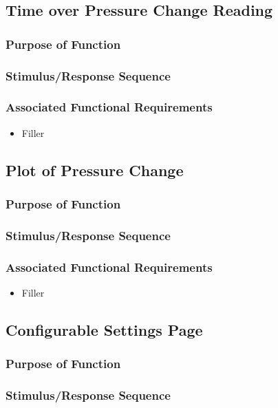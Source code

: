 \documentclass[onecolumn, draftclsnofoot,10pt, compsoc]{IEEEtran}
\begin{document}
\subsection{Time over Pressure Change Reading}
\subsubsection{Purpose of Function}
\subsubsection{Stimulus/Response Sequence}
\subsubsection{Associated Functional Requirements}
\begin{itemize}
\item Filler
\end{itemize}

\subsection{Plot of Pressure Change}
\subsubsection{Purpose of Function}
\subsubsection{Stimulus/Response Sequence}
\subsubsection{Associated Functional Requirements}
\begin{itemize}
\item Filler
\end{itemize}

\subsection{Configurable Settings Page}
\subsubsection{Purpose of Function}
\subsubsection{Stimulus/Response Sequence}
\end{document}

